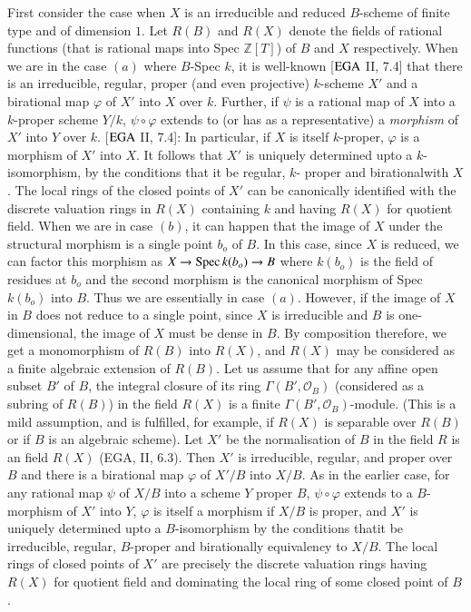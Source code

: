 First consider the case when $X$ is an irreducible and reduced
$B$-scheme of finite type and of dimension $1$. Let $R(B)$ and $R(X)$
denote the fields of rational functions (that is rational maps into
Spec $\mathbb{Z} [T]$) of $B$ and $X$ respectively. When we are in
the case $(a)$ where $B$-Spec $k$, it is well-known [$\operatorname{EGA}$ II, 7.4]
that there is an irreducible, regular, proper (and even projective)
$k$-scheme $X'$ and a birational map $\varphi$ of $X'$ into $X$ over
$k$. Further, if $\psi$ is a rational map of $X$ into a $k$-proper
scheme $Y/k$, $\psi \circ \varphi$ extends to (or has as a representative)
a \textit{morphism} of $X'$ into $Y$ over $k$. [$\operatorname{EGA}$ II, 7.4]: In
particular, if $X$ is itself $k$-proper, $\varphi$ is a morphism of $X'$
into $X$. It follows that $X'$ is uniquely determined upto a
$k$-isomorphism, by the conditions that it be regular, $k$- proper and
birational\pageoriginale with $X$. The local rings of the closed
points of $X'$ can 
be canonically identified with the discrete valuation rings in $R(X)$
containing $k$ and having $R(X)$ for quotient field. When we are in
case $(b)$, it can happen that the image of $X$ under the structural
morphism is a single point $b_o$ of $B$. In this case, since $X$ is
reduced, we can factor this morphism as $X \rightarrow \operatorname{Spec} k(b_o)
\rightarrow B$ where $k(b_o)$ is the field of residues at $b_o$ and
the second morphism is the canonical morphism of Spec $k (b_o)$ into
$B$. Thus we are essentially in case $(a)$. However, if the image of
$X$ in $B$ does not reduce to a single point, since $X$ is irreducible
and $B$ is one-dimensional, the image of $X$ must be dense in $B$. By
composition therefore, we get a monomorphism of $R(B)$ into $R(X)$,
and $R(X)$ may be considered as a finite algebraic extension of
$R(B)$. Let us assume that for any affine open subset $B'$ of $B$, the
integral closure of its ring $\Gamma (B',\mathscr{O}_B)$ (considered as a
subring of $R(B)$) in the field $R(X)$ is a finite $\Gamma (B',
\mathscr{O}_B)$-module. (This is a mild assumption, and is fulfilled, for
example, if $R(X)$ is separable over $R(B)$ or if $B$ is an algebraic
scheme). Let $X'$ be the normalisation of $B$ in the field $R$
 is an field $R(X)$ (EGA, II, 6.3). Then $X'$ is irreducible, regular,
 and proper over 
$B$ and there is a birational map $\varphi$ of $X'/B$ into $X/B$. As
in the earlier case, for any rational map $\psi$ of $X/B$ into a scheme
$Y$ proper $B$, $\psi \circ \varphi$ extends to a $B$-morphism of $X'$ into
$Y$, $\varphi$ is itself a morphism if $X/B$ is proper, and $X'$ is
uniquely determined upto a $B$-isomorphism by the conditions
that\pageoriginale it be 
irreducible, regular, $B$-proper and birationally equivalency to
$X/B$. The local rings of closed points of $X'$ are precisely the
discrete valuation rings having $R(X)$ for quotient field and
dominating the local ring of some closed point of $B$. 

